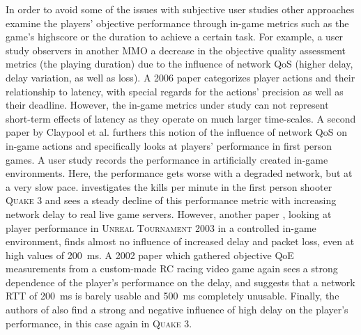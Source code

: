 In order to avoid some of the issues with subjective user studies other approaches examine the players' objective performance through in-game metrics such as the game's highscore or the duration to achieve a certain task. For example, a user study \cite{Chen:2006:SOG:1167838.1167859} observers in another \gls{MMO} a decrease in the objective quality assessment metrics (the playing duration) due to the influence of network \gls{QoS} (higher delay, delay variation, as well as loss). A 2006 paper \cite{Claypool:2006:LPA:1167838.1167860} categorizes player actions and their relationship to latency, with special regards for the actions' precision as well as their deadline. However, the in-game metrics under study can not represent short-term effects of latency as they operate on much larger time-scales. 
A second paper by Claypool et al. \cite{claypool2007} furthers this notion of the influence of network \gls{QoS} on in-game actions and specifically looks at players' performance in first person games. A user study records the performance in artificially created in-game environments. Here, the performance gets worse with a degraded network, but at a very slow pace. %
\cite{1266180} investigates the kills per minute in the first person shooter \textsc{Quake 3} and sees a steady decline of this performance metric with increasing network delay to real live game servers. However, another paper \cite{Beigbeder:2004:ELL:1016540.1016556}, looking at player performance in \textsc{Unreal Tournament 2003} in a controlled in-game environment, finds almost no influence of increased delay and packet loss, even at high values of \SI{200}{\milli\second}. %
A 2002 paper \cite{Pantel:2002:IDR:507670.507674} which gathered objective \gls{QoE} measurements from a custom-made RC racing video game again sees a strong dependence of the player's performance on the delay, and suggests that a network \acrshort{RTT} of \SI{200}{\milli\second} is barely usable and \SI{500}{\milli\second} completely unusable. Finally, the authors of \cite{Bredel:2010:MSR:1944796.1944797} also find a strong and negative influence of high delay on the player's performance, in this case again in \textsc{Quake 3}. 

